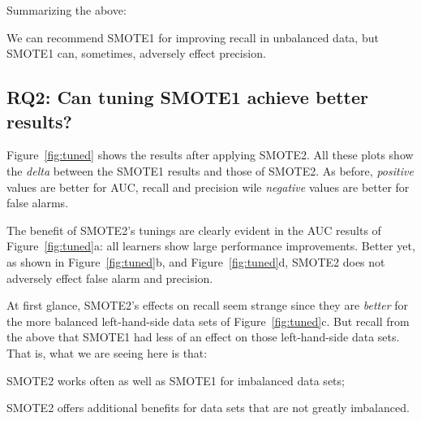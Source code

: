 \noindent
Summarizing the above:
\begin{lesson1}
We can recommend SMOTE1 for improving recall in unbalanced data, but SMOTE1 can,
sometimes, adversely effect
precision.
\end{lesson1}

\subsection{\textbf{RQ2: Can tuning SMOTE1 achieve better results?}}

Figure~\ref{fig:tuned} shows the results
after applying SMOTE2. All these
plots show the {\em delta} between
the SMOTE1 results and those of SMOTE2.
As before, {\em positive}  values
are better for AUC, recall and precision
wile {\em negative} values are better for false alarms.

The benefit of SMOTE2's tunings are clearly evident in the AUC results of  Figure~\ref{fig:tuned}a:
all learners show large performance improvements. 
Better yet,  as
shown in
Figure~\ref{fig:tuned}b, and Figure~\ref{fig:tuned}d, SMOTE2 does
not adversely effect false alarm and precision.


At first glance, SMOTE2's effects on recall seem strange since they are
{\em better} for the more balanced left-hand-side data sets of
Figure~\ref{fig:tuned}c.  But recall from the above that SMOTE1 had less
of an effect on those left-hand-side data sets. That is, what we are seeing
here is that:
\bi
\item
SMOTE2 works often as well as SMOTE1 for imbalanced data sets;
\item
SMOTE2 offers additional benefits for data sets that are not greatly
imbalanced.
\ei

 





